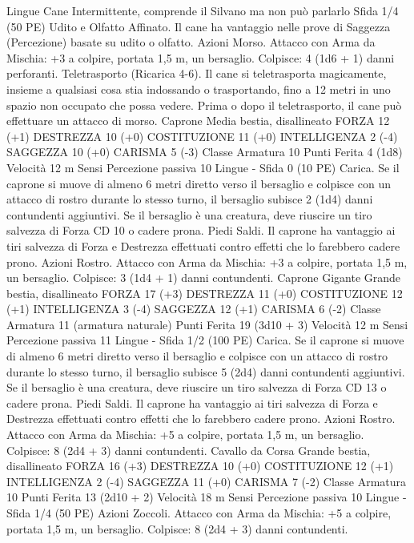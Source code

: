 \begin{multicols}{2}
Lingue Cane Intermittente, comprende il Silvano ma non può
parlarlo
Sfida 1/4 (50 PE)
Udito e Olfatto Affinato. Il cane ha vantaggio nelle prove di
Saggezza (Percezione) basate su udito o olfatto.
Azioni
Morso. Attacco con Arma da Mischia: +3 a colpire, portata 1,5
m, un bersaglio.
Colpisce: 4 (1d6 + 1) danni perforanti.
Teletrasporto (Ricarica 4-6). Il cane si teletrasporta
magicamente, insieme a qualsiasi cosa stia indossando o
trasportando, fino a 12 metri in uno spazio non occupato che
possa vedere. Prima o dopo il teletrasporto, il cane può effettuare
un attacco di morso.
Caprone
Media bestia, disallineato
FORZA 12 (+1)
DESTREZZA 10 (+0)
COSTITUZIONE 11 (+0)
INTELLIGENZA 2 (-4)
SAGGEZZA 10 (+0)
CARISMA 5 (-3)
Classe Armatura 10
Punti Ferita 4 (1d8)
Velocità 12 m
Sensi Percezione passiva 10
Lingue -
Sfida 0 (10 PE)
Carica. Se il caprone si muove di almeno 6 metri diretto verso il
bersaglio e colpisce con un attacco di rostro durante lo stesso
turno, il bersaglio subisce 2 (1d4) danni contundenti aggiuntivi.
Se il bersaglio è una creatura, deve riuscire un tiro salvezza di
Forza CD 10 o cadere prona.
Piedi Saldi. Il caprone ha vantaggio ai tiri salvezza di Forza e
Destrezza effettuati contro effetti che lo farebbero cadere prono.
Azioni
Rostro. Attacco con Arma da Mischia: +3 a colpire, portata 1,5
m, un bersaglio.
Colpisce: 3 (1d4 + 1) danni contundenti.
Caprone Gigante
Grande bestia, disallineato
FORZA 17 (+3)
DESTREZZA 11 (+0)
COSTITUZIONE 12 (+1)
INTELLIGENZA 3 (-4)
SAGGEZZA 12 (+1)
CARISMA 6 (-2)
Classe Armatura 11 (armatura naturale)
Punti Ferita 19 (3d10 + 3)
Velocità 12 m
Sensi Percezione passiva 11
Lingue -
Sfida 1/2 (100 PE)
Carica. Se il caprone si muove di almeno 6 metri diretto verso il
bersaglio e colpisce con un attacco di rostro durante lo stesso
turno, il bersaglio subisce 5 (2d4) danni contundenti aggiuntivi.
Se il bersaglio è una creatura, deve riuscire un tiro salvezza di
Forza CD 13 o cadere prona.
Piedi Saldi. Il caprone ha vantaggio ai tiri salvezza di Forza e
Destrezza effettuati contro effetti che lo farebbero cadere prono.
Azioni
Rostro. Attacco con Arma da Mischia: +5 a colpire, portata 1,5
m, un bersaglio.
Colpisce: 8 (2d4 + 3) danni contundenti.
Cavallo da Corsa
Grande bestia, disallineato
FORZA 16 (+3)
DESTREZZA 10 (+0)
COSTITUZIONE 12 (+1)
INTELLIGENZA 2 (-4)
SAGGEZZA 11 (+0)
CARISMA 7 (-2)
Classe Armatura 10
Punti Ferita 13 (2d10 + 2)
Velocità 18 m
Sensi Percezione passiva 10
Lingue -
Sfida 1/4 (50 PE)
Azioni
Zoccoli. Attacco con Arma da Mischia: +5 a colpire, portata 1,5
m, un bersaglio.
Colpisce: 8 (2d4 + 3) danni contundenti. 

\end{multicols}
